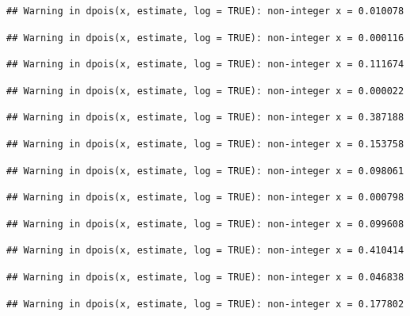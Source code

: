 \documentclass[]{article}
\begin{document}
\begin{verbatim}
## Warning in dpois(x, estimate, log = TRUE): non-integer x = 0.010078
\end{verbatim}

\begin{verbatim}
## Warning in dpois(x, estimate, log = TRUE): non-integer x = 0.000116
\end{verbatim}

\begin{verbatim}
## Warning in dpois(x, estimate, log = TRUE): non-integer x = 0.111674
\end{verbatim}

\begin{verbatim}
## Warning in dpois(x, estimate, log = TRUE): non-integer x = 0.000022
\end{verbatim}

\begin{verbatim}
## Warning in dpois(x, estimate, log = TRUE): non-integer x = 0.387188
\end{verbatim}

\begin{verbatim}
## Warning in dpois(x, estimate, log = TRUE): non-integer x = 0.153758
\end{verbatim}

\begin{verbatim}
## Warning in dpois(x, estimate, log = TRUE): non-integer x = 0.098061
\end{verbatim}

\begin{verbatim}
## Warning in dpois(x, estimate, log = TRUE): non-integer x = 0.000798
\end{verbatim}

\begin{verbatim}
## Warning in dpois(x, estimate, log = TRUE): non-integer x = 0.099608
\end{verbatim}

\begin{verbatim}
## Warning in dpois(x, estimate, log = TRUE): non-integer x = 0.410414
\end{verbatim}

\begin{verbatim}
## Warning in dpois(x, estimate, log = TRUE): non-integer x = 0.046838
\end{verbatim}

\begin{verbatim}
## Warning in dpois(x, estimate, log = TRUE): non-integer x = 0.177802
\end{verbatim}
\end{document}
